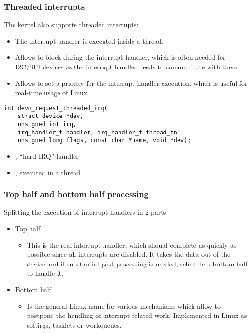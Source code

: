 \begin{frame}[fragile]
  \frametitle{Threaded interrupts}
  The kernel also supports threaded interrupts:
  \begin{itemize}
  \item The interrupt handler is executed inside a thread.
  \item Allows to block during the interrupt handler, which is often
        needed for I2C/SPI devices as the interrupt handler needs to
        communicate with them.
  \item Allows to set a priority for the interrupt handler
        execution, which is useful for real-time usage of Linux
  \end{itemize}
  \begin{verbatim}
int devm_request_threaded_irq(
    struct device *dev,
    unsigned int irq,
    irq_handler_t handler, irq_handler_t thread_fn
    unsigned long flags, const char *name, void *dev);
  \end{verbatim}
  \begin{itemize}
  \item {}, ``hard IRQ'' handler
  \item {}, executed in a thread
  \end{itemize}
\end{frame}

\begin{frame}
  \frametitle{Top half and bottom half processing}
  Splitting the execution of interrupt handlers in 2 parts
  \begin{itemize}
  \item Top half
    \begin{itemize}
    \item This is the real interrupt handler, which should complete
      as quickly as possible since all interrupts are disabled.
      It takes the data out of the device and if substantial
      post-processing is needed, schedule a bottom half to handle it. 
    \end{itemize}
  \item Bottom half
    \begin{itemize}
    \item Is the general Linux name for various mechanisms which
      allow to postpone the handling of interrupt-related
      work. Implemented in Linux as softirqs, tasklets or
      workqueues.
    \end{itemize}
  \end{itemize}
\end{frame}

